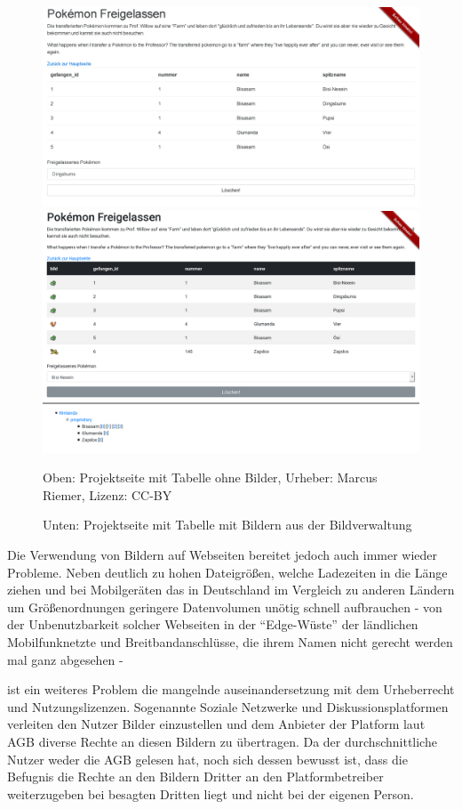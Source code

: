 \begin{figure}
  \includegraphics[width=\columnwidth]{images/introduction-example-before.png}
  \includegraphics[width=\columnwidth]{images/introduction-example-after.png}

  Oben: Projektseite mit Tabelle ohne Bilder, Urheber: Marcus Riemer, Lizenz: CC-BY

  Unten: Projektseite mit Tabelle mit Bildern aus der Bildverwaltung
\end{figure}

Die Verwendung von Bildern auf Webseiten bereitet jedoch auch immer wieder
Probleme. Neben deutlich zu hohen Dateigrößen, welche Ladezeiten in die Länge
ziehen und bei Mobilgeräten das in Deutschland im Vergleich zu anderen Ländern um
Größenordnungen geringere Datenvolumen unötig schnell aufbrauchen - von der
Unbenutzbarkeit solcher Webseiten in der ``Edge-Wüste'' der ländlichen
Mobilfunknetzte und Breitbandanschlüsse, die ihrem Namen nicht gerecht werden
mal ganz abgesehen - 


ist ein weiteres Problem die mangelnde auseinandersetzung
mit dem Urheberrecht und Nutzungslizenzen\todo{}. Sogenannte Soziale Netzwerke und
Diskussionsplatformen verleiten den Nutzer Bilder einzustellen und dem Anbieter der
Platform laut AGB diverse Rechte an diesen Bildern zu übertragen. Da der
durchschnittliche Nutzer weder die AGB gelesen hat, noch sich dessen bewusst
ist, dass die Befugnis die Rechte an den Bildern Dritter an den
Platformbetreiber weiterzugeben bei besagten Dritten liegt und nicht bei der
eigenen Person.

